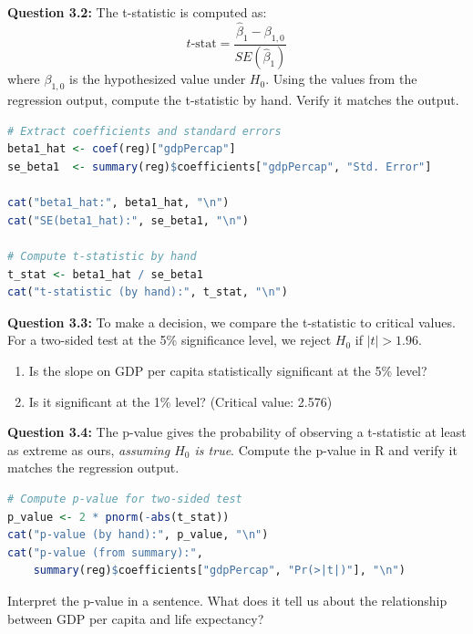 \documentclass[11pt,letterpaper]{article}
\begin{document}
\vspace{2cm}

\textbf{Question 3.2:} The t-statistic is computed as:
\[
t\text{-stat} = \frac{\hat{\beta}_1 - \beta_{1,0}}{SE(\hat{\beta}_1)}
\]
where $\beta_{1,0}$ is the hypothesized value under $H_0$. Using the values from the regression output, compute the t-statistic by hand. Verify it matches the output.

\begin{lstlisting}[language=R]
# Extract coefficients and standard errors
beta1_hat <- coef(reg)["gdpPercap"]
se_beta1  <- summary(reg)$coefficients["gdpPercap", "Std. Error"]

cat("beta1_hat:", beta1_hat, "\n")
cat("SE(beta1_hat):", se_beta1, "\n")

# Compute t-statistic by hand
t_stat <- beta1_hat / se_beta1
cat("t-statistic (by hand):", t_stat, "\n")
\end{lstlisting}

\vspace{2cm}

\textbf{Question 3.3:} To make a decision, we compare the t-statistic to critical values. For a two-sided test at the 5\% significance level, we reject $H_0$ if $|t| > 1.96$.

\begin{enumerate}[label=(\alph*)]
\item Is the slope on GDP per capita statistically significant at the 5\% level?
\item Is it significant at the 1\% level? (Critical value: 2.576)
\end{enumerate}

\vspace{2cm}

\textbf{Question 3.4:} The p-value gives the probability of observing a t-statistic at least as extreme as ours, \textit{assuming $H_0$ is true}. Compute the p-value in R and verify it matches the regression output.

\begin{lstlisting}[language=R]
# Compute p-value for two-sided test
p_value <- 2 * pnorm(-abs(t_stat))
cat("p-value (by hand):", p_value, "\n")
cat("p-value (from summary):",
    summary(reg)$coefficients["gdpPercap", "Pr(>|t|)"], "\n")
\end{lstlisting}

\vspace{0.5cm}

Interpret the p-value in a sentence. What does it tell us about the relationship between GDP per capita and life expectancy?
\end{document}
